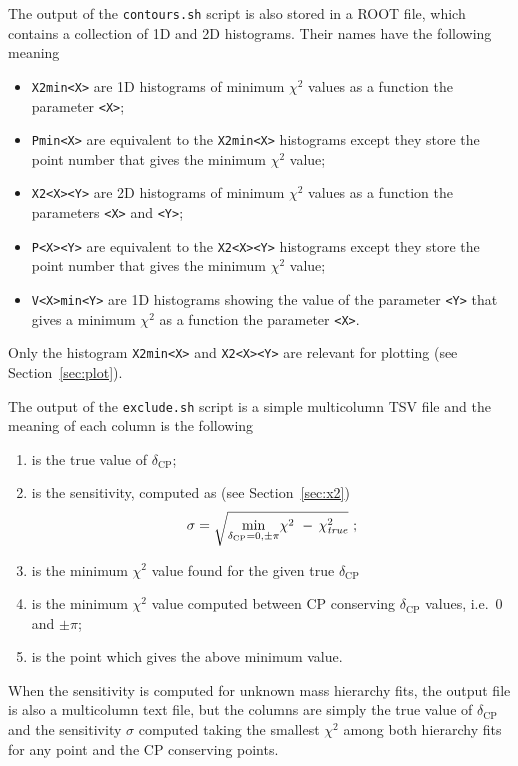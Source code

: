 \documentclass[a4paper, 11pt]{article}
\newcommand{\refsec}[1]{Section~\ref{#1}}
\begin{document}
The output of the \texttt{contours.sh} script is also stored in a ROOT file, which %
contains a collection of 1D and 2D histograms.
Their names have the following meaning
\begin{itemize}
	\item \texttt{X2min<X>} are 1D histograms of minimum $\chi^2$ values as a function %
		the parameter \texttt{<X>};
	\item \texttt{Pmin<X>} are equivalent to the \texttt{X2min<X>} histograms except they %
		store the point number that gives the minimum $\chi^2$ value;
	\item \texttt{X2<X><Y>} are 2D histograms of minimum $\chi^2$ values as a function %
		the parameters \texttt{<X>} and \texttt{<Y>};
	\item \texttt{P<X><Y>} are equivalent to the \texttt{X2<X><Y>} histograms except they %
		store the point number that gives the minimum $\chi^2$ value;
	\item \texttt{V<X>min<Y>} are 1D histograms showing the value of the parameter \texttt{<Y>} %
		that gives a minimum $\chi^2$ as a function the parameter \texttt{<X>}.
\end{itemize}
Only the histogram \texttt{X2min<X>} and \texttt{X2<X><Y>} are relevant for plotting (see \refsec{sec:plot}).

The output of the \texttt{exclude.sh} script is a simple multicolumn TSV file %
and the meaning of each column is the following
\begin{enumerate}
	\item is the true value of $\delta_\text{CP}$;
	\item is the sensitivity, computed as (see \refsec{sec:x2})
		\[
			\sigma = \sqrt{\min_{\delta_\text{CP} = 0,\pm\pi}\! \chi^2\  -\,\chi^2_\text{\emph{true}}}\ ;
		\]
	\item is the minimum $\chi^2$ value found for the given true $\delta_\text{CP}$
	\item is the minimum $\chi^2$ value computed between CP conserving $\delta_\text{CP}$ values, %
		i.e.\ $0$ and $\pm\pi$;
	\item is the point which gives the above minimum value.
\end{enumerate}
When the sensitivity is computed for unknown mass hierarchy fits, the output file is %
also a multicolumn text file, but the columns are simply the true value of $\delta_\text{CP}$ %
and the sensitivity $\sigma$ computed taking the smallest $\chi^2$ among both hierarchy fits %
for any point and the CP conserving points.
\end{document}
